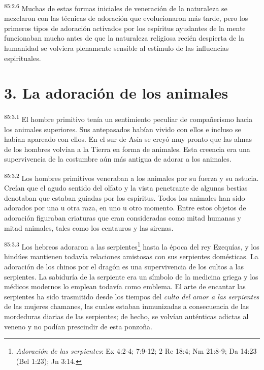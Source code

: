 \documentclass[twoside, 11pt]{book}
\begin{document}
\par
\textsuperscript{85:2.6} Muchas de estas formas iniciales de veneración de la naturaleza se mezclaron con las técnicas de adoración que evolucionaron más tarde, pero los primeros tipos de adoración activados por los espíritus ayudantes de la mente funcionaban mucho antes de que la naturaleza religiosa recién despierta de la humanidad se volviera plenamente sensible al estímulo de las influencias espirituales.

\section*{3. La adoración de los animales}
\par
\textsuperscript{85:3.1} El hombre primitivo tenía un sentimiento peculiar de compañerismo hacia los animales superiores. Sus antepasados habían vivido con ellos e incluso se habían apareado con ellos. En el sur de Asia se creyó muy pronto que las almas de los hombres volvían a la Tierra en forma de animales. Esta creencia era una supervivencia de la costumbre aún más antigua de adorar a los animales.

\par
\textsuperscript{85:3.2} Los hombres primitivos veneraban a los animales por su fuerza y su astucia. Creían que el agudo sentido del olfato y la vista penetrante de algunas bestias denotaban que estaban guiadas por los espíritus. Todos los animales han sido adorados por una u otra raza, en uno u otro momento. Entre estos objetos de adoración figuraban criaturas que eran consideradas como mitad humanas y mitad animales, tales como los centauros y las sirenas.

\par
\textsuperscript{85:3.3} Los hebreos adoraron a las serpientes\footnote{\textit{Adoración de las serpientes}: Ex 4:2-4; 7:9-12; 2 Re 18:4; Nm 21:8-9; Da 14:23 (Bel 1:23); Jn 3:14.} hasta la época del rey Ezequías, y los hindúes mantienen todavía relaciones amistosas con sus serpientes domésticas. La adoración de los chinos por el dragón es una supervivencia de los cultos a las serpientes. La sabiduría de la serpiente era un símbolo de la medicina griega y los médicos modernos lo emplean todavía como emblema. El arte de encantar las serpientes ha sido trasmitido desde los tiempos del \textit{culto del amor a las serpientes} de las mujeres chamanes, las cuales estaban inmunizadas a consecuencia de las mordeduras diarias de las serpientes; de hecho, se volvían auténticas adictas al veneno y no podían prescindir de esta ponzoña.
\end{document}
